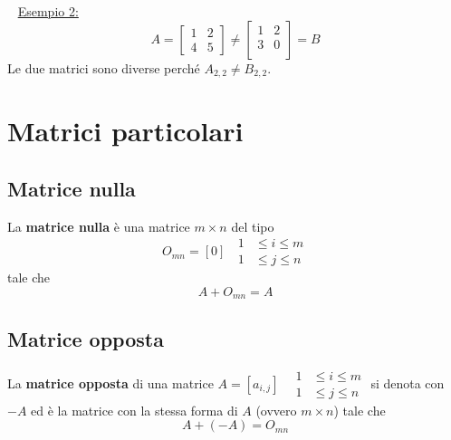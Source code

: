 \documentclass[11pt,oneside]{book}
\begin{document}
~\newline
\underline{Esempio 2:}
\begin{equation*}
    A=
    \begin{bmatrix}
        1 & 2 \\
        4 & 5
    \end{bmatrix}
    \neq
    \begin{bmatrix}
        1 & 2 \\
        3 & 0 \\
    \end{bmatrix}
    =B
\end{equation*}
Le due matrici sono diverse perché $A_{2,2} \neq B_{2,2}$.

\section{Matrici particolari}
\subsection{Matrice nulla}
La \textbf{matrice nulla} è una matrice $m \times n$ del tipo
\begin{equation*}
    O_{mn} = [0] \;\; \begin{aligned} 1&\le i\le m\\ 1&\le j\le n \end{aligned}
\end{equation*}
tale che
\begin{equation*}
    A + O_{mn} = A
\end{equation*}

\subsection{Matrice opposta}
La \textbf{matrice opposta} di una matrice $A = [a_{i,j}] \;\;$ \tiny$ \begin{aligned} 1&\le i\le m\\ 1&\le j\le n \end{aligned}$ \normalsize  \newline
si denota con $-A$ ed è la matrice con la stessa forma di $A$ (ovvero $m \times n$) tale che
\begin{equation*}
    A + (-A) = O_{mn}
\end{equation*}
\end{document}
